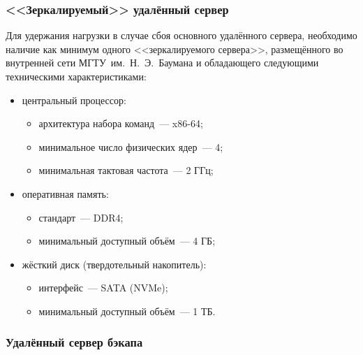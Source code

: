 \documentclass{bmstu}
\begin{document}
  \subsubsection{<<Зеркалируемый>> удалённый сервер}
  
  Для удержания нагрузки в случае сбоя основного удалённого сервера, необходимо наличие как минимум одного <<зеркалируемого сервера>>, размещённого во внутренней сети МГТУ~им.~Н.~Э.~Баумана и обладающего
  следующими техническими характеристиками:
  \begin{itemize}[label=---]
  	\item центральный процессор:
  	\begin{itemize}[label=---]
  		\item архитектура набора команд~--- x86-64;
  		\item минимальное число физических ядер~--- 4;
  		\item минимальная тактовая частота~--- 2 ГГц;
  	\end{itemize}
  	\item оперативная память:
  	\begin{itemize}[label=---]
  		\item стандарт~--- DDR4;
  		\item минимальный доступный объём~--- 4 ГБ;
  	\end{itemize}
  	\item жёсткий диск (твердотельный накопитель):
  	\begin{itemize}[label=---]
  		\item интерфейс~--- SATA (NVMe);
  		\item минимальный доступный объём~--- 1 ТБ.
  	\end{itemize}
  \end{itemize}
  
  \subsubsection{Удалённый сервер бэкапа}
  
\end{document}
